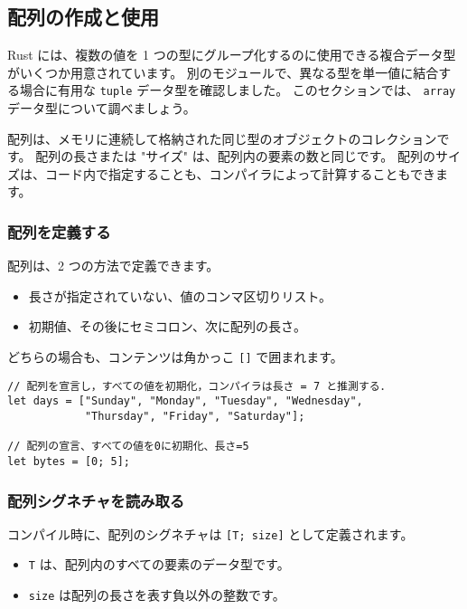 \subsection{配列の作成と使用}

Rust には、複数の値を 1 つの型にグループ化するのに使用できる複合データ型がいくつか用意されています。 別のモジュールで、異なる型を単一値に結合する場合に有用な \texttt{tuple} データ型を確認しました。 このセクションでは、 \texttt{array} データ型について調べましょう。

配列は、メモリに連続して格納された同じ型のオブジェクトのコレクションです。 配列の長さまたは "サイズ" は、配列内の要素の数と同じです。 配列のサイズは、コード内で指定することも、コンパイラによって計算することもできます。

\subsubsection{配列を定義する}

配列は、2 つの方法で定義できます。

\begin{itemize}
\item 長さが指定されていない、値のコンマ区切りリスト。
\item 初期値、その後にセミコロン、次に配列の長さ。
\end{itemize}

どちらの場合も、コンテンツは角かっこ \texttt{[]} で囲まれます。


\begin{lstlisting}[numbers=none]
// 配列を宣言し，すべての値を初期化，コンパイラは長さ = 7 と推測する．
let days = ["Sunday", "Monday", "Tuesday", "Wednesday",
            "Thursday", "Friday", "Saturday"];
  
// 配列の宣言、すべての値を0に初期化、長さ=5
let bytes = [0; 5];
\end{lstlisting}

\subsubsection{配列シグネチャを読み取る}

コンパイル時に、配列のシグネチャは \texttt{[T; size]} として定義されます。

\begin{itemize}
\item \texttt{T} は、配列内のすべての要素のデータ型です。
\item \texttt{size} は配列の長さを表す負以外の整数です。
\end{itemize}

